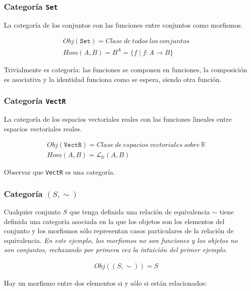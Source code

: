 \documentclass[11pt, fleqn, spanish]{book}
\begin{document}
\subsubsection{Categoría \texttt{Set}}
La categoría de los conjuntos con las funciones entre conjuntos como morfismos.

\begin{gather*}
  Obj(\texttt{Set}) = Clase\ de\ todos\ los\ conjuntos \\
  Hom(A,B)= B^A = \{f \;|\; f: A \rightarrow B \}
\end{gather*}

Trivialmente es categoría: las funciones se componen en funciones, la
composición es asociativa y la identidad funciona como se espera,
siendo otra función.

\subsubsection{Categoría \texttt{VectR}}
La categoría de los espacios vectoriales reales con las funciones lineales entre
espacios vectoriales reales.

\begin{gather*}
  Obj(\texttt{VectR}) = Clase\ de\ espacios\ vectoriales\ sobre\ \mathbb{R} \\
  Hom(A,B)= \mathcal{L}_{\mathbb{R}}(A,B)
\end{gather*}

\begin{exercise} 
  Observar que \texttt{VectR} es una categoría.
\end{exercise}

\subsubsection{Categoría \texttt{$(S,\sim)$}}
Cualquier conjunto $S$ que tenga definida una relación de equivalencia $\sim$ tiene
definida una categoría asociada en la que los objetos son los elementos del conjunto
y los morfismos sólo representan casos particulares de la relación de equivalencia.
\textit{En este ejemplo, los morfismos no son funciones y los objetos no son conjuntos,
  rechazando por primera vez la intuición del primer ejemplo.}

\begin{gather*}
  Obj((S,\sim)) = S
\end{gather*}

Hay un morfismo entre dos elementos si y sólo si están relacionados:
\end{document}
